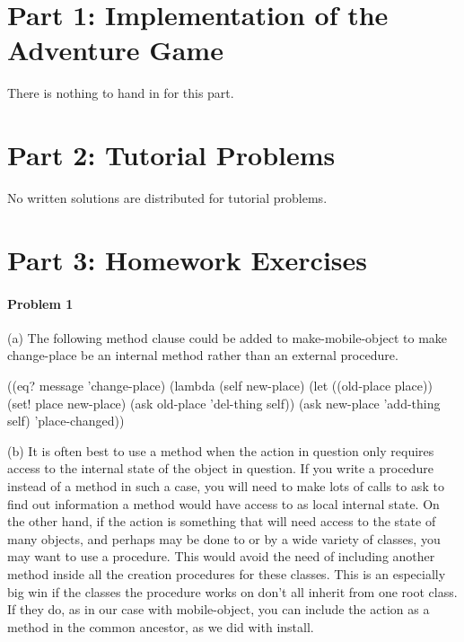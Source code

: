 
%
%




\medskip

\section{Part 1: Implementation of the Adventure Game}

There is nothing to hand in for this part.

\section{Part 2: Tutorial Problems}

No written solutions are distributed for tutorial problems. 

\section{Part 3: Homework Exercises}

\paragraph{Problem 1}

(a) The following method clause could be added to {\cf
make-mobile-object} to make {\cf change-place} be an internal method
rather than an external procedure.

\beginlisp
((eq? message 'change-place)          
 (lambda (self new-place)             
   (let ((old-place place))           
     (set! place new-place)           
     (ask old-place 'del-thing self)) 
   (ask new-place 'add-thing self)    
   'place-changed))                   
\endlisp

(b) It is often best to use a method when the action in question only
requires access to the internal state of the object in question.  If
you write a procedure instead of a
method in such a case, you will need to make lots of calls to {\cf ask}
to find out information a method would have access to as local
internal state.  On the other hand, if the action is something that
will need access to the state of many objects, and perhaps may be done
to or by a wide variety of classes, you may want to use a
procedure.  This would avoid the need of including another method
inside all the creation procedures for these classes.  This is an
especially big win if the classes the procedure works on don't all
inherit from one root class.  If they do, as in our case with {\cf
mobile-object}, you can include the action as a method in the common
ancestor, as we did with {\cf install}.

